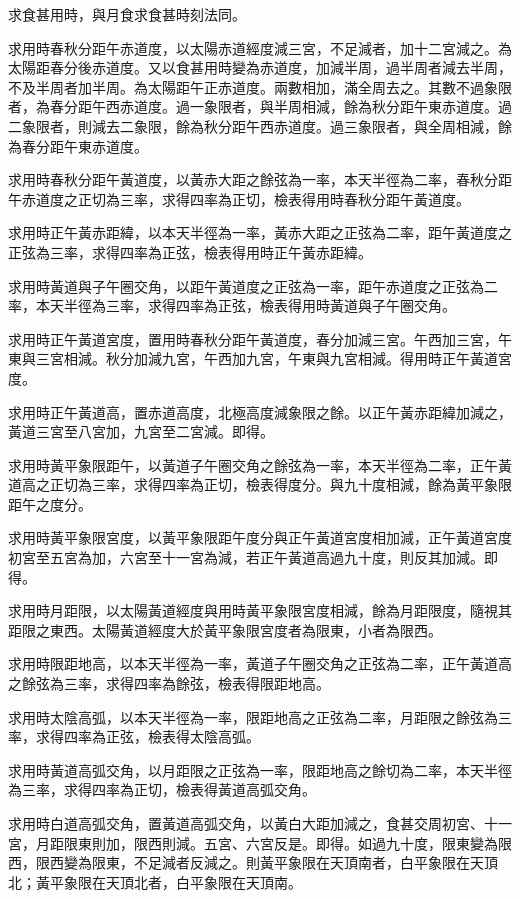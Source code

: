 \begin{pinyinscope}
求食甚用時，與月食求食甚時刻法同。

求用時春秋分距午赤道度，以太陽赤道經度減三宮，不足減者，加十二宮減之。為太陽距春分後赤道度。又以食甚用時變為赤道度，加減半周，過半周者減去半周，不及半周者加半周。為太陽距午正赤道度。兩數相加，滿全周去之。其數不過象限者，為春分距午西赤道度。過一象限者，與半周相減，餘為秋分距午東赤道度。過二象限者，則減去二象限，餘為秋分距午西赤道度。過三象限者，與全周相減，餘為春分距午東赤道度。

求用時春秋分距午黃道度，以黃赤大距之餘弦為一率，本天半徑為二率，春秋分距午赤道度之正切為三率，求得四率為正切，檢表得用時春秋分距午黃道度。

求用時正午黃赤距緯，以本天半徑為一率，黃赤大距之正弦為二率，距午黃道度之正弦為三率，求得四率為正弦，檢表得用時正午黃赤距緯。

求用時黃道與子午圈交角，以距午黃道度之正弦為一率，距午赤道度之正弦為二率，本天半徑為三率，求得四率為正弦，檢表得用時黃道與子午圈交角。

求用時正午黃道宮度，置用時春秋分距午黃道度，春分加減三宮。午西加三宮，午東與三宮相減。秋分加減九宮，午西加九宮，午東與九宮相減。得用時正午黃道宮度。

求用時正午黃道高，置赤道高度，北極高度減象限之餘。以正午黃赤距緯加減之，黃道三宮至八宮加，九宮至二宮減。即得。

求用時黃平象限距午，以黃道子午圈交角之餘弦為一率，本天半徑為二率，正午黃道高之正切為三率，求得四率為正切，檢表得度分。與九十度相減，餘為黃平象限距午之度分。

求用時黃平象限宮度，以黃平象限距午度分與正午黃道宮度相加減，正午黃道宮度初宮至五宮為加，六宮至十一宮為減，若正午黃道高過九十度，則反其加減。即得。

求用時月距限，以太陽黃道經度與用時黃平象限宮度相減，餘為月距限度，隨視其距限之東西。太陽黃道經度大於黃平象限宮度者為限東，小者為限西。

求用時限距地高，以本天半徑為一率，黃道子午圈交角之正弦為二率，正午黃道高之餘弦為三率，求得四率為餘弦，檢表得限距地高。

求用時太陰高弧，以本天半徑為一率，限距地高之正弦為二率，月距限之餘弦為三率，求得四率為正弦，檢表得太陰高弧。

求用時黃道高弧交角，以月距限之正弦為一率，限距地高之餘切為二率，本天半徑為三率，求得四率為正切，檢表得黃道高弧交角。

求用時白道高弧交角，置黃道高弧交角，以黃白大距加減之，食甚交周初宮、十一宮，月距限東則加，限西則減。五宮、六宮反是。即得。如過九十度，限東變為限西，限西變為限東，不足減者反減之。則黃平象限在天頂南者，白平象限在天頂北；黃平象限在天頂北者，白平象限在天頂南。


\end{pinyinscope}
